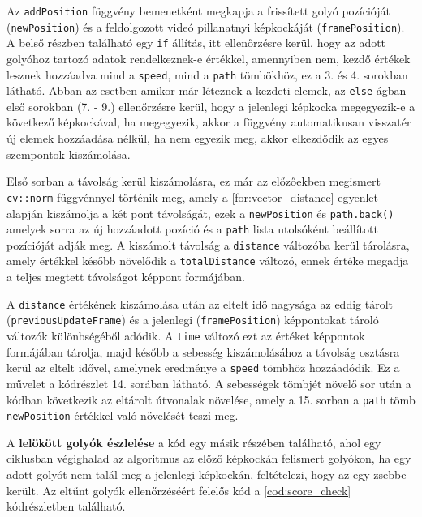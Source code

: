 \par Az \lstinline{addPosition} függvény bemenetként megkapja a frissített golyó pozícióját (\lstinline{newPosition}) és a feldolgozott videó pillanatnyi képkockáját (\lstinline{framePosition}). A belső részben található egy \lstinline{if} állítás, itt ellenőrzésre kerül, hogy az adott golyóhoz tartozó adatok rendelkeznek-e értékkel, amennyiben nem, kezdő értékek lesznek hozzáadva mind a \lstinline{speed}, mind a \lstinline{path} tömbökhöz, ez a 3. és 4. sorokban látható. Abban az esetben amikor már léteznek a kezdeti elemek, az \lstinline{else} ágban első sorokban (7. - 9.) ellenőrzésre kerül, hogy a jelenlegi képkocka megegyezik-e a következő képkockával, ha megegyezik, akkor a függvény automatikusan visszatér új elemek hozzáadása nélkül, ha nem egyezik meg, akkor elkezdődik az egyes szempontok kiszámolása.
\par Első sorban a távolság kerül kiszámolásra, ez már az előzőekben megismert \lstinline{cv::norm} függvénnyel\cite{opencv_docs} történik meg, amely a \ref{for:vector_distance} egyenlet alapján kiszámolja a két pont távolságát, ezek a \lstinline{newPosition} és \lstinline{path.back()} amelyek sorra az új hozzáadott pozíció és a \lstinline{path} lista utolsóként beállított pozícióját adják meg. A kiszámolt távolság a \lstinline{distance} változóba kerül tárolásra, amely értékkel később növelődik a \lstinline{totalDistance} változó, ennek értéke megadja a teljes megtett távolságot képpont formájában.
\par A \lstinline{distance} értékének kiszámolása után az eltelt idő nagysága az eddig tárolt (\lstinline{previousUpdateFrame}) és a jelenlegi (\lstinline{framePosition}) képpontokat tároló változók különbségéből adódik. A \lstinline{time} változó ezt az értéket képpontok formájában tárolja, majd később a sebesség kiszámolásához a távolság osztásra kerül az eltelt idővel, amelynek eredménye a \lstinline{speed} tömbhöz hozzáadódik. Ez a művelet a kódrészlet 14. sorában látható. A sebességek tömbjét növelő sor után a kódban következik az eltárolt útvonalak növelése, amely a 15. sorban a \lstinline{path} tömb \lstinline{newPosition} értékkel való növelését teszi meg.
\par A \textbf{lelökött golyók észlelése} a kód egy másik részében található, ahol egy ciklusban végighalad az algoritmus az előző képkockán felismert golyókon, ha egy adott golyót nem talál meg a jelenlegi képkockán, feltételezi, hogy az egy zsebbe került. Az eltűnt golyók ellenőrzéséért felelős kód a \ref{cod:score_check} kódrészletben található.

